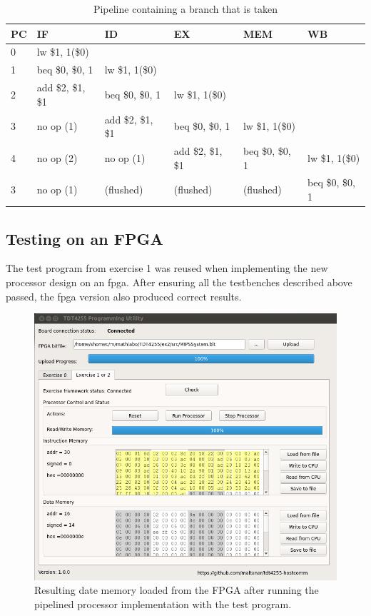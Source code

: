 \begin{table}[h]
    \begin{tabular}{l|lllll}
    PC & IF                 & ID                 & EX                 & MEM              & WB               \\ \hline
    0  & lw   \$1, 1(\$0)   & ~                  & ~                  & ~                & ~                \\
    1  & beq  \$0, \$0, 1   & lw   \$1, 1(\$0)   & ~                  & ~                & ~                \\
    2  & add  \$2, \$1, \$1 & beq  \$0, \$0, 1   & lw   \$1, 1(\$0)   & ~                & ~                \\
    3  & no op (1)          & add  \$2, \$1, \$1 & beq  \$0, \$0, 1   & lw   \$1, 1(\$0) & ~                \\
    4  & no op (2)          & no op (1)          & add  \$2, \$1, \$1 & beq  \$0, \$0, 1 & lw   \$1, 1(\$0) \\
    3  & no op (1)          & (flushed)          & (flushed)          & (flushed)        & beq  \$0, \$0, 1 \\
    \end{tabular}
\caption{Pipeline containing a branch that is taken}
\label{tbl:branching}
\end{table}

\newpage
\subsection{Testing on an FPGA}
The test program from exercise 1 was reused when implementing the new processor design on an \gls{fpga}.
After ensuring all the testbenches described above passed,
the \gls{fpga} version also produced correct results.

\begin{figure}[h]
    \centering
    \includegraphics[width=\textwidth]{img/hostcomm}
    \caption{Resulting date memory loaded from the FPGA after running the pipelined processor implementation with the test program.}
    \label{fig:hostcomm}
\end{figure}

